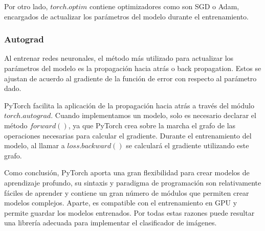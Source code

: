 Por otro lado, $torch.optim$ contiene optimizadores como son SGD o Adam, encargados de actualizar los parámetros del modelo durante el entrenamiento. \cite{pytorch-doc}

\subsubsection{Autograd}
Al entrenar redes neuronales, el método más utilizado para actualizar los parámetros del modelo es la propagación hacia atrás o back propagation. Estos se ajustan de acuerdo al gradiente de la función de error con respecto al parámetro dado.

PyTorch facilita la aplicación de la propagación hacia atrás a través del módulo $torch.autograd$. Cuando implementamos un modelo, solo es necesario declarar el método $forward()$, ya que PyTorch crea sobre la marcha el grafo de las operaciones necesarias para calcular el gradiente. Durante el entrenamiento del modelo, al llamar a $loss.backward()$ se calculará el gradiente utilizando este grafo. \cite{pytorch-doc}

Como conclusión, PyTorch aporta una gran flexibilidad para crear modelos de aprendizaje profundo, su sintaxis y paradigma de programación son relativamente fáciles de aprender y contiene un gran número de módulos que permiten crear modelos complejos. Aparte, es compatible con el entrenamiento en GPU y permite guardar los modelos entrenados. Por todas estas razones puede resultar una librería adecuada para implementar el clasificador de imágenes.